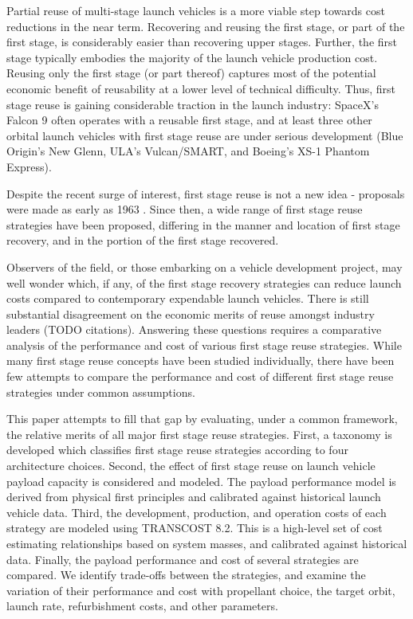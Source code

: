 \documentclass[conf]{new-aiaa}
\begin{document}
Partial reuse of multi-stage launch vehicles is a more viable step towards cost reductions in the near term. Recovering and reusing the first stage, or part of the first stage, is considerably easier than recovering upper stages. Further, the first stage typically embodies the majority of the launch vehicle production cost. Reusing only the first stage (or part thereof) captures most of the potential economic benefit of reusability at a lower level of technical difficulty. Thus, first stage reuse is gaining considerable traction in the launch industry: SpaceX's Falcon 9 often operates with a reusable first stage, and at least three other orbital launch vehicles with first stage reuse are under serious development (Blue Origin's New Glenn, ULA's Vulcan/SMART, and Boeing's XS-1 Phantom Express).

Despite the recent surge of interest, first stage reuse is not a new idea - proposals were made as early as 1963 \cite{Nexus, SeaDragon}. Since then, a wide range of first stage reuse strategies have been proposed, differing in the manner and location of first stage recovery, and in the portion of the first stage recovered.

Observers of the field, or those embarking on a vehicle development project, may well wonder which, if any, of the first stage recovery strategies can reduce launch costs compared to contemporary expendable launch vehicles. There is still substantial disagreement on the economic merits of reuse amongst industry leaders (TODO citations). Answering these questions requires a comparative analysis of the performance and cost of various first stage reuse strategies. While many first stage reuse concepts have been studied individually, there have been few attempts to compare the performance and cost of different first stage reuse strategies under common assumptions. 

This paper attempts to fill that gap by evaluating, under a common framework, the relative merits of all major first stage reuse strategies. First, a taxonomy is developed which classifies first stage reuse strategies according to four architecture choices. Second, the effect of first stage reuse on launch vehicle payload capacity is considered and modeled. The payload performance model is derived from physical first principles and calibrated against historical launch vehicle data. Third, the development, production, and operation costs of each strategy are modeled using TRANSCOST 8.2. This is a high-level set of cost estimating relationships based on system masses, and calibrated against historical data. Finally, the payload performance and cost of several strategies are compared. We identify trade-offs between the strategies, and examine the variation of their performance and cost with propellant choice, the target orbit, launch rate, refurbishment costs, and other parameters.
\end{document}
